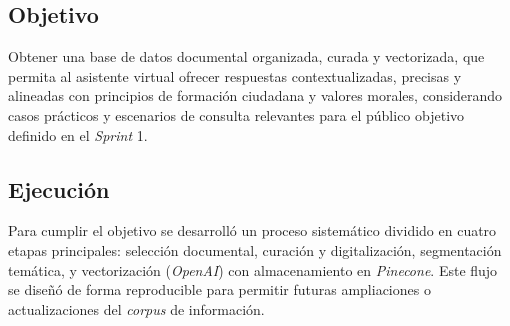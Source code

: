 \subsection{Objetivo}
Obtener una base de datos documental organizada, curada y vectorizada, que
permita al asistente virtual ofrecer respuestas contextualizadas, precisas y
alineadas con principios de formación ciudadana y valores morales, considerando
casos prácticos y escenarios de consulta relevantes para el público objetivo
definido en el \textit{Sprint} 1.

\subsection{Ejecución}

Para cumplir el objetivo se desarrolló un proceso sistemático dividido en
cuatro etapas principales: selección documental, curación y digitalización,
segmentación temática, y vectorización (\textit{OpenAI}) con almacenamiento en
\textit{Pinecone}. Este flujo se diseñó de forma reproducible para permitir
futuras ampliaciones o actualizaciones del \textit{corpus} de información.

